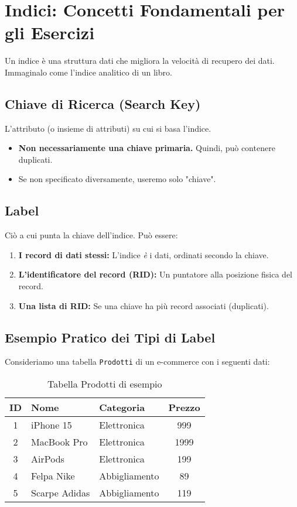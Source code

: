 \section{Indici: Concetti Fondamentali per gli Esercizi}
Un indice è una struttura dati che migliora la velocità di recupero dei dati. Immaginalo come l'indice analitico di un libro.

\subsection{Chiave di Ricerca (Search Key)}
L'attributo (o insieme di attributi) su cui si basa l'indice.
\begin{itemize}
    \item \textbf{Non necessariamente una chiave primaria.} Quindi, può contenere duplicati.
    \item Se non specificato diversamente, useremo solo "chiave".
\end{itemize}

\subsection{Label}
Ciò a cui punta la chiave dell'indice. Può essere:
\begin{enumerate}
    \item \textbf{I record di dati stessi:} L'indice \textit{è} i dati, ordinati secondo la chiave.
    \item \textbf{L'identificatore del record (RID):} Un puntatore alla posizione fisica del record.
    \item \textbf{Una lista di RID:} Se una chiave ha più record associati (duplicati).
\end{enumerate}

\subsection{Esempio Pratico dei Tipi di Label}
Consideriamo una tabella \texttt{Prodotti} di un e-commerce con i seguenti dati:

\begin{table}[H]
\centering
\begin{tabular}{|c|l|l|c|}
\hline
\textbf{ID} & \textbf{Nome} & \textbf{Categoria} & \textbf{Prezzo} \\
\hline
1 & iPhone 15 & Elettronica & 999 \\
2 & MacBook Pro & Elettronica & 1999 \\
3 & AirPods & Elettronica & 199 \\
4 & Felpa Nike & Abbigliamento & 89 \\
5 & Scarpe Adidas & Abbigliamento & 119 \\
\hline
\end{tabular}
\caption{Tabella Prodotti di esempio}
\end{table}

